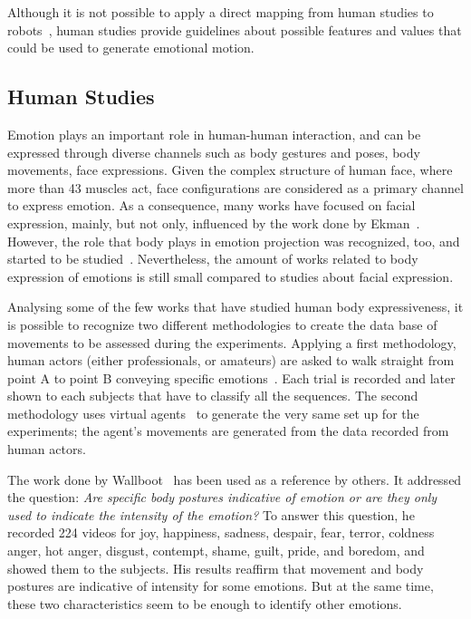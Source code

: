 
Although it is not possible to apply a direct mapping from human studies to robots~\cite{Saerbeck2007,Canamero2010}, human studies provide guidelines about possible features and values that could be used to generate emotional motion. 

\subsection{Human Studies}

Emotion plays an important role in human-human interaction, and can be expressed through diverse channels such as body gestures and poses, body movements, face expressions. Given the complex structure of human face, where more than 43 muscles act, face configurations are considered as a primary channel to express emotion. As a consequence, many works have focused on facial expression, mainly, but not only, influenced by the work done by Ekman~\cite{Ekman2004}. However, the role that body plays in emotion projection was recognized, too, and started to be studied~\cite{Gelder2008,Wallboot1998}. Nevertheless, the amount of works related to body expression of emotions is still small compared to studies about facial expression. 

Analysing some of the few works that have studied human body expressiveness, it is possible to recognize two different methodologies to create the data base of movements to be assessed during the experiments. Applying a first methodology, human actors (either professionals, or amateurs) are asked to walk straight from point A to point B conveying specific emotions~\cite{Dael2012,Meijer1989,Wallboot1998}. Each trial is recorded and later shown to each subjects that have to classify all the sequences. The second methodology uses virtual agents~\cite{Roether2009,Venture2014} to generate the very same set up for the experiments; the agent's movements are generated from the data recorded from human actors.

The work done by Wallboot~\cite{Wallboot1998} has been used as a reference by others. It addressed the question: \textit{Are specific body postures indicative of emotion or are they only used to indicate the intensity of the emotion?} To answer this question, he recorded 224 videos for joy, happiness, sadness, despair, fear, terror, coldness anger, hot anger, disgust, contempt, shame, guilt, pride, and boredom, and showed them to the subjects. His results reaffirm that movement and body postures are indicative of intensity for some emotions. But at the same time, these two characteristics seem to be enough to identify other emotions. 

